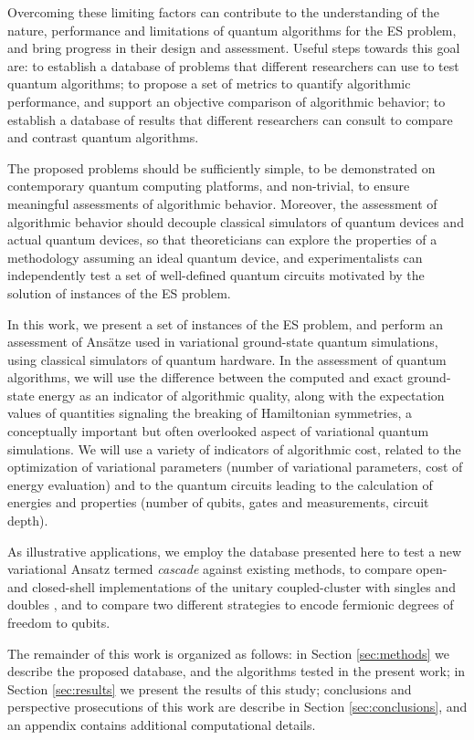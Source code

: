 \documentclass[aps,pra,onecolumn]{revtex4-2}
\begin{document}
Overcoming these limiting factors can contribute to the understanding of the nature, performance and limitations of quantum algorithms for the ES problem, and bring progress in their design and assessment.
Useful steps towards this goal are:
to establish a database of problems that different researchers can use to test quantum algorithms;
to propose a set of metrics to quantify algorithmic performance, and support an objective comparison of algorithmic behavior;
to establish a database of results that different researchers can consult to compare and contrast quantum algorithms.

The proposed problems should be sufficiently simple, to be demonstrated on contemporary quantum computing platforms, and non-trivial, to ensure meaningful assessments of algorithmic behavior.
Moreover, the assessment of algorithmic behavior should decouple classical simulators of quantum devices and actual quantum devices,
so that theoreticians can explore the properties of a methodology assuming an ideal quantum device, and experimentalists can independently test a set of well-defined quantum circuits motivated by the solution of instances of the ES problem.
 
In this work, we present a set of instances of the ES problem, and perform an assessment of Ans\"{a}tze used in variational ground-state quantum simulations,
using classical simulators of quantum hardware.
In the assessment of quantum algorithms, we will use the difference between the computed and exact ground-state energy as an indicator of algorithmic quality,
along with the expectation values of quantities signaling the breaking of Hamiltonian symmetries, a conceptually important but often overlooked aspect of variational quantum simulations.
We will use a variety of indicators of algorithmic cost, related to the optimization of variational parameters (number of variational parameters, cost of energy evaluation)
and to the quantum circuits leading to the calculation of energies and properties (number of qubits, gates and measurements, circuit depth).

As illustrative applications, we employ the database presented here to test a new variational Ansatz termed {\em{cascade}} against existing methods,
to compare open- and closed-shell implementations of the unitary coupled-cluster with singles and doubles \cite{scuseria1987closed,szalay1997spin}, 
and to compare two different strategies to encode fermionic degrees of freedom to qubits.

The remainder of this work is organized as follows: 
in Section \ref{sec:methods} we describe the proposed database, and the algorithms tested in the present work;
in Section \ref{sec:results} we present the results of this study;
conclusions and perspective prosecutions of this work are describe in Section \ref{sec:conclusions},
and an appendix contains additional computational details.
\end{document}
